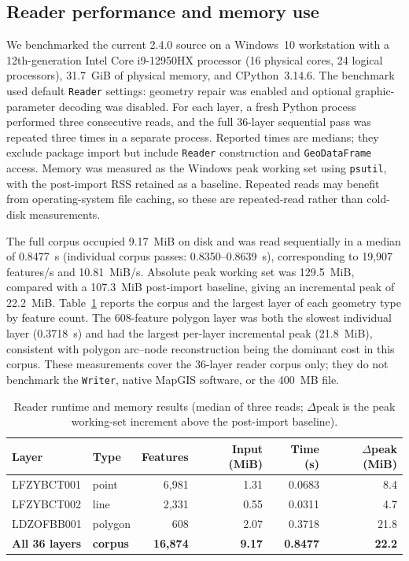 \documentclass[11pt,a4paper]{article}
\begin{document}
\subsection{Reader performance and memory use}
\label{sec:performance}
We benchmarked the current 2.4.0 source on a Windows~10 workstation with a 12th-generation Intel Core i9-12950HX processor (16 physical cores, 24 logical processors), 31.7~GiB of physical memory, and CPython~3.14.6. The benchmark used default \texttt{Reader} settings: geometry repair was enabled and optional graphic-parameter decoding was disabled. For each layer, a fresh Python process performed three consecutive reads, and the full 36-layer sequential pass was repeated three times in a separate process. Reported times are medians; they exclude package import but include \texttt{Reader} construction and \texttt{GeoDataFrame} access. Memory was measured as the Windows peak working set using \texttt{psutil}, with the post-import RSS retained as a baseline. Repeated reads may benefit from operating-system file caching, so these are repeated-read rather than cold-disk measurements.

The full corpus occupied 9.17~MiB on disk and was read sequentially in a median of 0.8477~s (individual corpus passes: 0.8350--0.8639~s), corresponding to 19{,}907 features/s and 10.81~MiB/s. Absolute peak working set was 129.5~MiB, compared with a 107.3~MiB post-import baseline, giving an incremental peak of 22.2~MiB. Table~\ref{tab:performance} reports the corpus and the largest layer of each geometry type by feature count. The 608-feature polygon layer was both the slowest individual layer (0.3718~s) and had the largest per-layer incremental peak (21.8~MiB), consistent with polygon arc--node reconstruction being the dominant cost in this corpus. These measurements cover the 36-layer reader corpus only; they do not benchmark the \texttt{Writer}, native MapGIS software, or the 400~MB file.

\begin{table}[h]
\centering
\caption{Reader runtime and memory results (median of three reads; $\Delta$peak is the peak working-set increment above the post-import baseline).}
\label{tab:performance}
\small
\begin{tabular}{llrrrr}
\toprule
Layer & Type & Features & Input (MiB) & Time (s) & $\Delta$peak (MiB) \\
\midrule
LFZYBCT001 & point & 6{,}981 & 1.31 & 0.0683 & 8.4 \\
LFZYBCT002 & line & 2{,}331 & 0.55 & 0.0311 & 4.7 \\
LDZOFBB001 & polygon & 608 & 2.07 & 0.3718 & 21.8 \\
\midrule
\textbf{All 36 layers} & \textbf{corpus} & \textbf{16{,}874} & \textbf{9.17} & \textbf{0.8477} & \textbf{22.2} \\
\bottomrule
\end{tabular}
\end{table}
\end{document}
